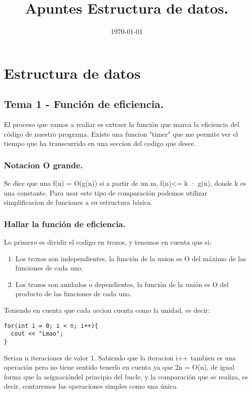 \documentclass[11pt]{article}
\date{\today}
\title{Apuntes Estructura de datos.}
\begin{document}
\maketitle

\section{Estructura de datos}
\label{sec-1}
\subsection{Tema 1 - Función de eficiencia.}
\label{sec-1-1}
El proceso que vamos a realiar es extraer la función que marca la eficiencia del código de nuestro programa.
Existe una funcion "timer" que me permite ver el tiempo que ha transcurrido en una seccion del codigo que desee.
\subsubsection{Notacion O grande.}
\label{sec-1-1-1}
Se dice que una f(n) = O(g(n)) si a partir de un m,  f(n)<= k · g(n), donde k es una constante.
Para usar este tipo de comparación podemos utilizar simplificacion de funciones a su estructura básica.
\subsubsection{Hallar la función de eficiencia.}
\label{sec-1-1-2}

Lo primero es dividir el codigo en trozos, y tenemos en cuenta que si:
\begin{enumerate}
\item Los troxos son independientes, la función de la union es O del máximo de las funciones de cada uno.
\item Los trozos son anidados o dependientes, la función de la unión es O del producto de las funciones de cada uno.
\end{enumerate}

Teniendo en cuenta que cada accion cuenta como la unidad, es decir:

\begin{verbatim}
for(int i = 0; i < n; i++){
  cout << "Lmao";
}
\end{verbatim}
Serian n iteraciones de valor 1. Sabiendo que la iteracion i++ tambien es una operación pero no tiene sentido tenerlo en cuenta ya que 2n = O(n), de igual forma que la asignacióndel principio del bucle, y la comparación que se realiza, es decir, contaremos las operaciones simples como una única.
\end{document}
